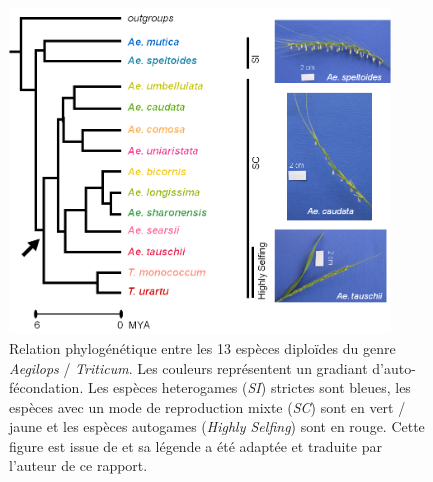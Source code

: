 \documentclass[../main]{subfiles} %
\begin{document}
\addto\extrasfrench{\protected\edef:{\unexpanded\expandafter{:}}}

\begin{figure}[ht]
    \centering
    \includegraphics[width=0.9\textwidth]{../Illustrations/phylogenetic-relationships-modified.png}
    \caption{Relation phylogénétique entre les 13 espèces diploïdes du genre \textit{Aegilops} / \textit{Triticum}. Les couleurs représentent un gradiant d'auto-fécondation. Les espèces \glspl{heterogame} (\textit{SI}) strictes sont bleues, les espèces avec un mode de reproduction mixte (\textit{SC}) sont en vert / jaune et les espèces \glspl{autogame} (\textit{Highly Selfing}) sont en rouge. Cette figure est issue de \cite{glemin_pervasive_2019} et sa légende a été adaptée et traduite par l'auteur de ce rapport.}
    \label{fig:Phylo}
\end{figure}


\end{document}
